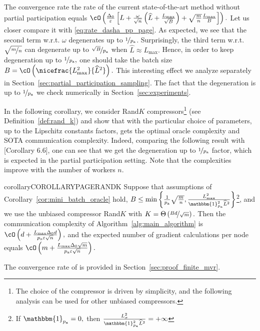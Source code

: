 \documentclass{article}
\newcommand{\algorithmname}{DASHA-PP}
\newcommand*{\probavailable}{\ensuremath{p_{\textnormal{a}}}}
\begin{document}
The convergence rate the rate of the current state-of-the-art method  without partial participation equals
$\cO\left(\frac{\Delta_0}{\varepsilon}\left[L + \frac{\omega}{\sqrt{n}}\left(\widehat{L} + \frac{L_{\max}}{\sqrt{B}}\right) + \sqrt{\frac{m}{n}}\frac{L_{\max}}{B}\right]\right).$ Let us closer compare it with \eqref{eq:rate_dasha_pp_page}. As expected, we see that the second term w.r.t. $\omega$ degenerates up to $\nicefrac{1}{\probavailable}$. Surprisingly, the third term w.r.t. $\sqrt{\nicefrac{m}{n}}$ can degenerate up to $\nicefrac{\sqrt{B}}{\probavailable}$ when $\widehat{L} \approx L_{\max}.$ Hence, in order to keep degeneration up to $\nicefrac{1}{\probavailable},$ one should take the batch size $B = \cO\left(\nicefrac{L_{\max}^2}{\widehat{L}^2}\right).$ This interesting effect we analyze separately in Section~\ref{sec:partial_participation_sampling}. The fact that the degeneration is up to $\nicefrac{1}{\probavailable}$ we check numerically in Section~\ref{sec:experiments}.

In the following corollary, we consider Rand$K$ compressors\footnote{The choice of the compressor is driven by simplicity, and the following analysis can be used for other unbiased compressors.} (see Definition~\ref{def:rand_k}) and show that with the particular choice of parameters, up to the Lipschitz constants factors, \algname{\algorithmname-PAGE} gets the optimal oracle complexity and SOTA communication complexity. Indeed, comparing the following result with \citep{tyurin2022dasha}[Corollary 6.6], one can see that we get the degeneration up to $\nicefrac{1}{\probavailable}$ factor, which is expected in the partial participation setting. 
Note that the complexities improve with the number of workers $n.$

\begin{restatable}{corollary}{COROLLARYPAGERANDK}
  \label{cor:mini_batch_oracle:randk}
  Suppose that assumptions of Corollary~\ref{cor:mini_batch_oracle} hold, $B \leq \min\left\{\frac{1}{\probavailable}\sqrt{\frac{m}{n}},\frac{L_{\max}^2}{\mathbbm{1}_{\probavailable}^2 \widehat{L}^2}\right\}$\footnote{If $\mathbbm{1}_{\probavailable} = 0,$ then $\frac{L_{\sigma}^2}{\mathbbm{1}_{\probavailable}^2 \widehat{L}^2} = +\infty$}, and we use the unbiased compressor Rand$K$ with $K = \Theta\left(\nicefrac{B d}{\sqrt{m}}\right).$ Then
  the communication complexity of Algorithm~\ref{alg:main_algorithm} is
  $
      \cO\left(d + \frac{L_{\max} \Delta_0 d}{\probavailable \varepsilon \sqrt{n}}\right),
  $
and the expected number of gradient calculations per node equals
  $
      \cO\left(m + \frac{L_{\max} \Delta_0 \sqrt{m}}{\probavailable \varepsilon \sqrt{n}} \right).
  $
\end{restatable}
The convergence rate of \algname{\algorithmname-FINITE-MVR} is provided in Section~\ref{sec:proof_finite_mvr}. 
\end{document}
